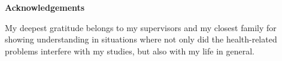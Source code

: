\thispagestyle{plain}

\mbox{}
\vfill

\large
\noindent \textbf{Acknowledgements}
\normalsize

\noindent My deepest gratitude belongs to my supervisors and my closest family for showing understanding in situations where not only did the health-related problems interfere with my studies, but also with my life in general.